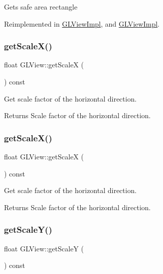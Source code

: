 Gets safe area rectangle 

Reimplemented in \hyperlink{classGLViewImpl_aeae826111cb62438b2038d311b95049b}{G\+L\+View\+Impl}, and \hyperlink{classGLViewImpl_ac25c5ec4b554f880becc5c448b3d70e2}{G\+L\+View\+Impl}.

\mbox{\label{classGLView_a98f6226c66f3614d21f61ed844ed28bb}} 
\subsubsection{\texorpdfstring{get\+Scale\+X()}{getScaleX()}\hspace{0.1cm}{\footnotesize\ttfamily [1/2]}}
{\footnotesize\ttfamily float G\+L\+View\+::get\+ScaleX (\begin{DoxyParamCaption}{ }\end{DoxyParamCaption}) const}

Get scale factor of the horizontal direction.

\begin{DoxyReturn}{Returns}
Scale factor of the horizontal direction. 
\end{DoxyReturn}
\mbox{\label{classGLView_a98f6226c66f3614d21f61ed844ed28bb}} 
\subsubsection{\texorpdfstring{get\+Scale\+X()}{getScaleX()}\hspace{0.1cm}{\footnotesize\ttfamily [2/2]}}
{\footnotesize\ttfamily float G\+L\+View\+::get\+ScaleX (\begin{DoxyParamCaption}{ }\end{DoxyParamCaption}) const}

Get scale factor of the horizontal direction.

\begin{DoxyReturn}{Returns}
Scale factor of the horizontal direction. 
\end{DoxyReturn}
\mbox{\label{classGLView_a3ee3994af139859a58568ccf3ba85aa6}} 
\subsubsection{\texorpdfstring{get\+Scale\+Y()}{getScaleY()}\hspace{0.1cm}{\footnotesize\ttfamily [1/2]}}
{\footnotesize\ttfamily float G\+L\+View\+::get\+ScaleY (\begin{DoxyParamCaption}{ }\end{DoxyParamCaption}) const}

